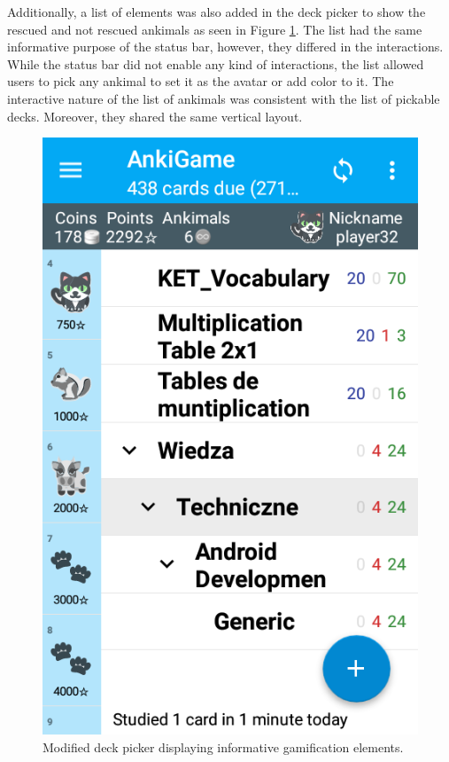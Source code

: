 Additionally, a list of elements was also added in the deck picker to show the rescued and not rescued ankimals as seen in Figure \ref{fig:progress}. The list had the same informative purpose of the status bar, however, they differed in the interactions. While the status bar did not enable any kind of interactions, the list allowed users to pick any ankimal to set it as the avatar or add color to it. The interactive nature of the list of ankimals was consistent with the list of pickable decks. Moreover, they shared the same vertical layout.

\begin{figure}[htb]
    \vskip 5mm
        \begin{center}
            \includegraphics[scale=0.4]{./Figures/progress.png}
            \caption{Modified deck picker displaying informative gamification elements.}
            \label{fig:progress}
        \end{center}
    \vskip -5mm
\end{figure}

